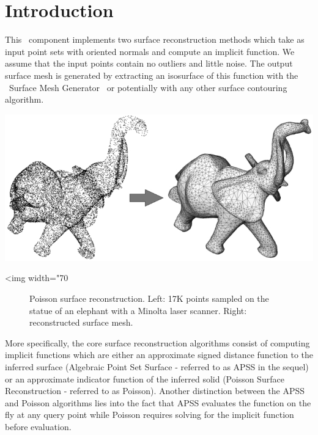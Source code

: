 \section{Introduction}

This \cgal\ component implements two surface reconstruction methods which take as input point sets with oriented normals and compute an implicit function. We assume that the input points contain no outliers and little noise. The output surface mesh is generated by extracting an isosurface of this function with the \cgal\ Surface Mesh Generator~\cite{cgal:ry-gsddrm-06} or potentially with any other surface contouring algorithm.

\begin{center}
    \label{Surface_reconstruction_points_3-fig-introduction}
    \begin{ccTexOnly}
        \includegraphics[width=1.0\textwidth]{Surface_reconstruction_points_3/introduction} %
    \end{ccTexOnly}
    \begin{ccHtmlOnly}
        <img width="70%
    \end{ccHtmlOnly}
    \begin{figure}[h]
        \caption{Poisson surface reconstruction.
                 Left: 17K points sampled on the statue of an
                 elephant with a Minolta laser scanner.
                 Right: reconstructed surface mesh.}
    \end{figure}
\end{center}

More specifically, the core surface reconstruction algorithms consist of computing implicit functions which are either an approximate signed distance function to the inferred surface (Algebraic Point Set Surface - referred to as APSS in the sequel) or an approximate indicator function of the inferred solid (Poisson Surface Reconstruction - referred to as Poisson). Another distinction between the APSS and Poisson algorithms lies into the fact that APSS evaluates the function on the fly at any query point while Poisson requires solving for the implicit function before evaluation.


